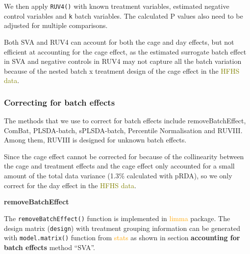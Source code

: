 \documentclass[
]{book}
\newenvironment{Shaded}{\begin{snugshade}}{\end{snugshade}}
\newcommand{\AttributeTok}[1]{\textcolor[rgb]{0.77,0.63,0.00}{#1}}
\newcommand{\FunctionTok}[1]{\textcolor[rgb]{0.00,0.00,0.00}{#1}}
\newcommand{\NormalTok}[1]{#1}
\newcommand{\OtherTok}[1]{\textcolor[rgb]{0.56,0.35,0.01}{#1}}
\newcommand{\SpecialCharTok}[1]{\textcolor[rgb]{0.00,0.00,0.00}{#1}}
\newcommand{\StringTok}[1]{\textcolor[rgb]{0.31,0.60,0.02}{#1}}
\begin{document}
We then apply \texttt{RUV4()} with known treatment variables, estimated negative control variables and \texttt{k} batch variables. The calculated P values also need to be adjusted for multiple comparisons.

\begin{Shaded}
\end{Shaded}

Both SVA and RUV4 can account for both the cage and day effects, but not efficient at accounting for the cage effect, as the estimated surrogate batch effect in SVA and negative controls in RUV4 may not capture all the batch variation because of the nested batch x treatment design of the cage effect in the \textcolor{olive}{HFHS data}.

\hypertarget{correcting-for-batch-effects-1}{%
\subsubsection{Correcting for batch effects}\label{correcting-for-batch-effects-1}}

The methods that we use to correct for batch effects include removeBatchEffect, ComBat, PLSDA-batch, sPLSDA-batch, Percentile Normalisation and RUVIII. Among them, RUVIII is designed for unknown batch effects.

Since the cage effect cannot be corrected for because of the collinearity between the cage and treatment effects and the cage effect only accounted for a small amount of the total data variance (1.3\% calculated with pRDA), so we only correct for the day effect in the \textcolor{olive}{HFHS data}.

\textbf{removeBatchEffect}

The \texttt{removeBatchEffect()} function is implemented in \textcolor{orange}{limma} package. The design matrix (\texttt{design}) with treatment grouping information can be generated with \texttt{model.matrix()} function from \textcolor{orange}{stats} as shown in section \textbf{accounting for batch effects} method ``SVA''.
\end{document}
